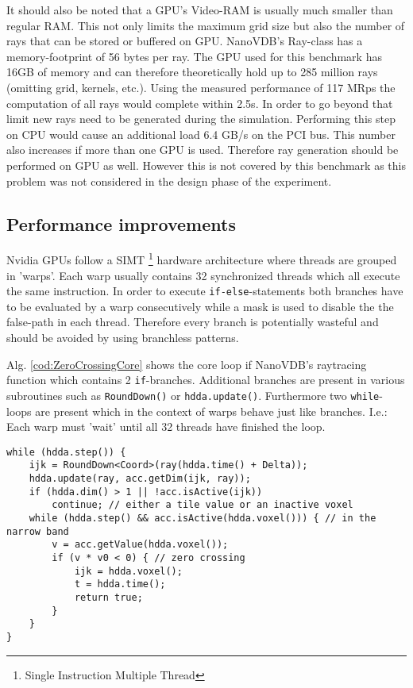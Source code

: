 It should also be noted that a GPU's Video-RAM is usually much smaller than regular RAM.
This not only limits the maximum grid size but also the number of rays that can be stored or buffered on GPU.
NanoVDB's Ray-class has a memory-footprint of 56 bytes per ray.
The GPU used for this benchmark has 16GB of memory and can therefore theoretically hold up to 285 million rays (omitting grid, kernels, etc.).
Using the measured performance of 117 MRps the computation of all rays would complete within 2.5s.
In order to go beyond that limit new rays need to be generated during the simulation.
Performing this step on CPU would cause an additional load 6.4 GB/s on the PCI bus.
This number also increases if more than one GPU is used.
Therefore ray generation should be performed on GPU as well.
However this is not covered by this benchmark as this problem was not considered in the design phase of the experiment.

\subsection{Performance improvements}
Nvidia GPUs follow a SIMT \footnote{Single Instruction Multiple Thread} hardware architecture where threads are grouped in 'warps'.
Each warp usually contains 32 synchronized threads which all execute the same instruction.
In order to execute \texttt{if-else}-statements both branches have to be evaluated by a warp consecutively while a mask is used to disable the the false-path in each thread. \cite[Chapter~3.6.3]{mccool}
Therefore every branch is potentially wasteful and should be avoided by using branchless patterns.


Alg. \ref{cod:ZeroCrossingCore} shows the core loop if NanoVDB's raytracing function which contains 2 \texttt{if}-branches.
Additional branches are present in various subroutines such as \texttt{RoundDown()} or \texttt{hdda.update()}.
Furthermore two \texttt{while}-loops are present which in the context of warps behave just like branches.
I.e.: Each warp must 'wait' until all 32 threads have finished the loop.

\begin{lstlisting}[caption={core loop of NanoVDB's raytraciong function}]
while (hdda.step()) {
    ijk = RoundDown<Coord>(ray(hdda.time() + Delta));
    hdda.update(ray, acc.getDim(ijk, ray));
    if (hdda.dim() > 1 || !acc.isActive(ijk))
        continue; // either a tile value or an inactive voxel
    while (hdda.step() && acc.isActive(hdda.voxel())) { // in the narrow band
        v = acc.getValue(hdda.voxel());
        if (v * v0 < 0) { // zero crossing
            ijk = hdda.voxel();
            t = hdda.time();
            return true;
        }
    }
}
\end{lstlisting}
\label{cod:ZeroCrossingCore}



